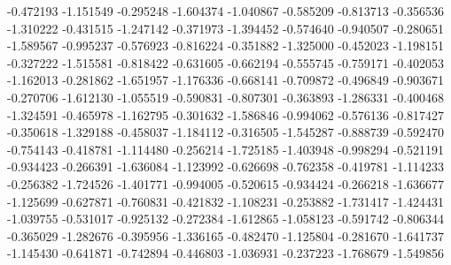-0.472193
-1.151549
-0.295248
-1.604374
-1.040867
-0.585209
-0.813713
-0.356536
-1.310222
-0.431515
-1.247142
-0.371973
-1.394452
-0.574640
-0.940507
-0.280651
-1.589567
-0.995237
-0.576923
-0.816224
-0.351882
-1.325000
-0.452023
-1.198151
-0.327222
-1.515581
-0.818422
-0.631605
-0.662194
-0.555745
-0.759171
-0.402053
-1.162013
-0.281862
-1.651957
-1.176336
-0.668141
-0.709872
-0.496849
-0.903671
-0.270706
-1.612130
-1.055519
-0.590831
-0.807301
-0.363893
-1.286331
-0.400468
-1.324591
-0.465978
-1.162795
-0.301632
-1.586846
-0.994062
-0.576136
-0.817427
-0.350618
-1.329188
-0.458037
-1.184112
-0.316505
-1.545287
-0.888739
-0.592470
-0.754143
-0.418781
-1.114480
-0.256214
-1.725185
-1.403948
-0.998294
-0.521191
-0.934423
-0.266391
-1.636084
-1.123992
-0.626698
-0.762358
-0.419781
-1.114233
-0.256382
-1.724526
-1.401771
-0.994005
-0.520615
-0.934424
-0.266218
-1.636677
-1.125699
-0.627871
-0.760831
-0.421832
-1.108231
-0.253882
-1.731417
-1.424431
-1.039755
-0.531017
-0.925132
-0.272384
-1.612865
-1.058123
-0.591742
-0.806344
-0.365029
-1.282676
-0.395956
-1.336165
-0.482470
-1.125804
-0.281670
-1.641737
-1.145430
-0.641871
-0.742894
-0.446803
-1.036931
-0.237223
-1.768679
-1.549856
